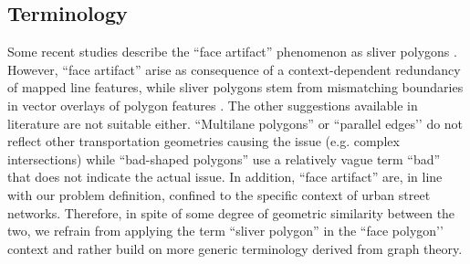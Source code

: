 \subsection*{Terminology}

Some recent studies describe the ``face artifact'' phenomenon as sliver polygons
\cite{grippa_mapping_2018, sanzana_decomposition_2018, ludwig_mapping_2021}. However,
``face artifact'' arise as consequence of a context-dependent redundancy of mapped line
features, while sliver polygons stem from mismatching boundaries in vector overlays of
polygon features \cite{goodchild_statistical_1978, fischer_using_1993,
delafontaine_assessment_2009}. The other suggestions available in
literature are not suitable either. ``Multilane polygons'' \cite{li_polygon-based_2014}
or ``parallel edges’’ \cite{vybornova_automated_2022} do not reflect other
transportation geometries causing the issue (e.g. complex intersections) while
``bad-shaped polygons'' use a relatively vague term ``bad'' that does not indicate the
actual issue. In addition, ``face artifact'' are, in line with our problem
definition, confined to the specific context of urban street networks. Therefore, in
spite of some degree of geometric similarity between the two, we refrain from applying
the term ``sliver polygon'' in the ``face polygon’’ context and rather build on more
generic terminology derived from graph theory.

